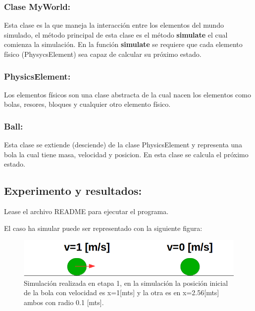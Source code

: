 \documentclass[a4paper,10pt]{article}
\begin{document}
\subsubsection{Clase MyWorld:}


Esta clase es la que maneja la interacción entre los elementos del mundo simulado, el método principal de esta clase es el método \textbf{simulate}
el cual comienza la simulación. En la función \textbf{simulate} 
se requiere que cada elemento físico (PhysycsElement) sea capaz de calcular su próximo estado.\newline

\subsubsection{PhysicsElement:}


Los elementos físicos son una clase abstracta de la cual nacen los elementos como bolas, resores, bloques y cualquier otro elemento físico.\newline

\subsubsection{Ball:}


Esta clase se extiende (desciende) de la clase PhysicsElement y representa una bola la cual tiene masa, velocidad y posicion. En esta clase 
se calcula el próximo estado.\newline


\subsection{Experimento y resultados:}

Lease el archivo README para ejecutar el programa.\newline

El caso ha simular puede ser representado con la siguiente figura:

\begin{figure}[H]
 \centering
 \includegraphics[scale=0.3]{./FigureA.png}
 \caption{Simulación realizada en etapa 1, en la simulación la posición inicial de la bola con velocidad es x=1[mts] y la otra es en x=2.56[mts] ambos con radio 0.1 [mts].}
  \label{etapa1.1}
\end{figure}
\end{document}
